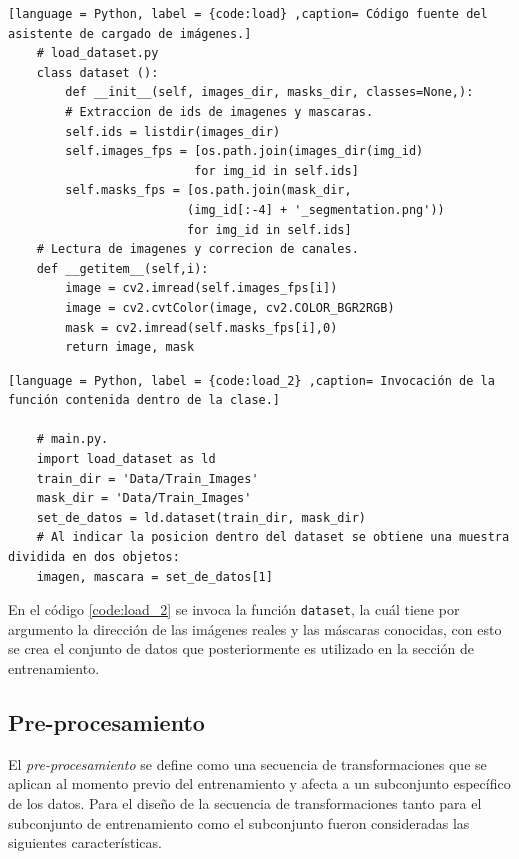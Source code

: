 \lstset{style=pystyle}
\begin{lstlisting}[language = Python, label = {code:load} ,caption= Código fuente del asistente de cargado de imágenes.]
    # load_dataset.py
    class dataset ():
        def __init__(self, images_dir, masks_dir, classes=None,):
        # Extraccion de ids de imagenes y mascaras.
        self.ids = listdir(images_dir)
        self.images_fps = [os.path.join(images_dir(img_id)
                          for img_id in self.ids]
        self.masks_fps = [os.path.join(mask_dir,
                         (img_id[:-4] + '_segmentation.png'))
                         for img_id in self.ids]
    # Lectura de imagenes y correcion de canales.
    def __getitem__(self,i):
        image = cv2.imread(self.images_fps[i])
        image = cv2.cvtColor(image, cv2.COLOR_BGR2RGB)
        mask = cv2.imread(self.masks_fps[i],0)
        return image, mask
\end{lstlisting}

\begin{lstlisting}[language = Python, label = {code:load_2} ,caption= Invocación de la función contenida dentro de la clase.]

    # main.py.
    import load_dataset as ld 
    train_dir = 'Data/Train_Images'
    mask_dir = 'Data/Train_Images'
    set_de_datos = ld.dataset(train_dir, mask_dir)
    # Al indicar la posicion dentro del dataset se obtiene una muestra dividida en dos objetos:
    imagen, mascara = set_de_datos[1]

\end{lstlisting}

En el código \ref{code:load_2} se invoca la función \texttt{dataset}, la cuál tiene por argumento la dirección de las imágenes reales y las máscaras conocidas, con esto se crea el conjunto de datos que posteriormente es utilizado en la sección de entrenamiento.


\subsection{Pre-procesamiento}
El \emph{pre-procesamiento} se define como una secuencia de transformaciones que se aplican al momento previo del entrenamiento y afecta a un subconjunto específico de los datos. Para el diseño de la secuencia de transformaciones tanto para el subconjunto de entrenamiento como el subconjunto fueron consideradas las siguientes características.

